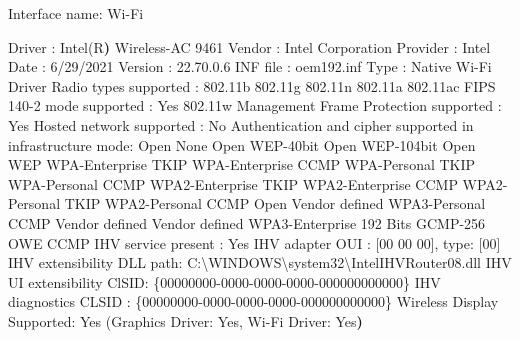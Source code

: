 \documentclass[
  doc,
  floatsintext,
  longtable,
  a4paper,
  nolmodern,
  notxfonts,
  notimes,
  colorlinks=true,linkcolor=blue,citecolor=blue,urlcolor=blue]{apa7}
\newenvironment{Shaded}{\begin{snugshade}}{\end{snugshade}}
\newcommand{\AttributeTok}[1]{\textcolor[rgb]{0.40,0.45,0.13}{#1}}
\newcommand{\BuiltInTok}[1]{\textcolor[rgb]{0.00,0.23,0.31}{#1}}
\newcommand{\KeywordTok}[1]{\textcolor[rgb]{0.00,0.23,0.31}{\textbf{#1}}}
\newcommand{\NormalTok}[1]{\textcolor[rgb]{0.00,0.23,0.31}{#1}}
\begin{document}
\begin{Shaded}
\begin{Highlighting}[]
\NormalTok{Interface name: Wi}\AttributeTok{{-}Fi}

\NormalTok{    Driver                    : Intel(R}\KeywordTok{)}\NormalTok{ Wireless{-}AC 9461}
\NormalTok{    Vendor                    : Intel Corporation}
\NormalTok{    Provider                  : Intel}
    \BuiltInTok{Date}\NormalTok{                      : 6}\AttributeTok{/29/2021}
\NormalTok{    Version                   : 22.70.0.6}
\NormalTok{    INF file                  : oem192.inf}
    \BuiltInTok{Type}\NormalTok{                      : Native Wi}\AttributeTok{{-}Fi}\NormalTok{ Driver}
\NormalTok{    Radio types supported     : 802.11b 802.11g 802.11n 802.11a 802.11ac}
\NormalTok{    FIPS 140}\AttributeTok{{-}2}\NormalTok{ mode supported : Yes}
\NormalTok{    802.11w Management Frame Protection supported : Yes}
\NormalTok{    Hosted network supported  : No}
\NormalTok{    Authentication and cipher supported in infrastructure mode:}
\NormalTok{                                Open            None}
\NormalTok{                                Open            WEP}\AttributeTok{{-}40bit}
\NormalTok{                                Open            WEP}\AttributeTok{{-}104bit}
\NormalTok{                                Open            WEP}
\NormalTok{                                WPA{-}Enterprise  TKIP}
\NormalTok{                                WPA{-}Enterprise  CCMP}
\NormalTok{                                WPA{-}Personal    TKIP}
\NormalTok{                                WPA{-}Personal    CCMP}
\NormalTok{                                WPA2{-}Enterprise TKIP}
\NormalTok{                                WPA2{-}Enterprise CCMP}
\NormalTok{                                WPA2{-}Personal   TKIP}
\NormalTok{                                WPA2{-}Personal   CCMP}
\NormalTok{                                Open            Vendor defined}
\NormalTok{                                WPA3{-}Personal   CCMP}
\NormalTok{                                Vendor defined  Vendor defined}
\NormalTok{                                WPA3{-}Enterprise 192 Bits GCMP}\AttributeTok{{-}256}
\NormalTok{                                OWE             CCMP}
\NormalTok{    IHV service present       : Yes}
\NormalTok{    IHV adapter OUI           : [00 00 00], type: [00]}
\NormalTok{    IHV extensibility DLL path: C:\textbackslash{}WINDOWS\textbackslash{}system32\textbackslash{}IntelIHVRouter08.dll}
\NormalTok{    IHV UI extensibility ClSID: \{00000000}\AttributeTok{{-}0000{-}0000{-}0000{-}000000000000}\NormalTok{\}}
\NormalTok{    IHV diagnostics CLSID     : \{00000000}\AttributeTok{{-}0000{-}0000{-}0000{-}000000000000}\NormalTok{\}}
\NormalTok{    Wireless Display Supported: Yes (Graphics Driver: Yes, Wi}\AttributeTok{{-}Fi}\NormalTok{ Driver: Yes}\KeywordTok{)}
\end{Highlighting}
\end{Shaded}
\end{document}
